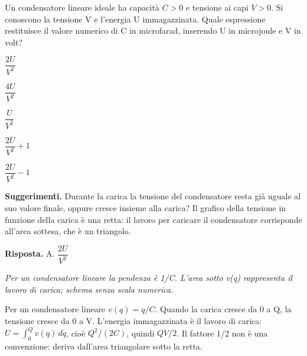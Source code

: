 \documentclass[11pt,a4paper]{article}
\begin{document}
\begin{samepage}
\par\smallskip
Un condensatore lineare ideale ha capacità \(C>0\) e tensione ai capi \(V>0\). Si conoscono la tensione V e l’energia U immagazzinata. Quale espressione restituisce il valore numerico di C in microfarad, inserendo U in microjoule e V in volt?\par


\begin{list}{}{\setlength{\leftmargin}{1.4em}\setlength{\itemsep}{.1em}\setlength{\parsep}{0pt}}\small
\item[A.] \(\dfrac{2U}{V^2}\)
\item[B.] \(\dfrac{4U}{V^2}\)
\item[C.] \(\dfrac{U}{V^2}\)
\item[D.] \(\dfrac{2U}{V^2}+1\)
\item[E.] \(\dfrac{2U}{V^2}-1\)
\end{list}
{\small\textbf{Suggerimenti.} Durante la carica la tensione del condensatore resta già uguale al suo valore finale, oppure cresce insieme alla carica? Il grafico della tensione in funzione della carica è una retta: il lavoro per caricare il condensatore corrisponde all’area sottesa, che è un triangolo.\par}
\medskip\noindent\textbf{Risposta.} A. \(\dfrac{2U}{V^2}\)\par

\begin{center}
\par
\small\itshape Per un condensatore lineare la pendenza è 1/C. L’area sotto v(q) rappresenta il lavoro di carica; schema senza scala numerica.
\end{center}
Per un condensatore lineare \(v(q)=q/C\). Quando la carica cresce da 0 a Q, la tensione cresce da 0 a V. L’energia immagazzinata è il lavoro di carica: \(U=\int_0^Q v(q)\,dq\), cioè \(Q^2/(2C)\), quindi \(QV/2\). Il fattore 1/2 non è una convenzione: deriva dall’area triangolare sotto la retta.\par


\end{samepage}
\end{document}
